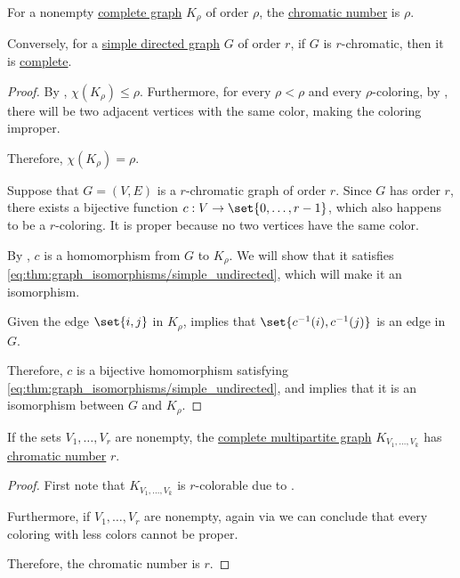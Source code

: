 \begin{proposition}\label{thm:complete_graph_chromatic_number}
  For a nonempty \hyperref[def:complete_graph]{complete graph} \( K_\rho \) of order \( \rho \), the \hyperref[def:graph_chromatic_number]{chromatic number} is \( \rho \).

  Conversely, for a \hyperref[def:directed_graph]{simple directed graph} \( G \) of  order \( r \), if \( G \) is \( r \)-chromatic, then it is \hyperref[def:complete_subgraph]{complete}.
\end{proposition}
\begin{proof}
  \SufficiencySubProof By , \( \chi(K_\rho) \leq \rho \). Furthermore, for every \( \rho < \rho \) and every \( \rho \)-coloring, by , there will be two adjacent vertices with the same color, making the coloring improper.

  Therefore, \( \chi(K_\rho) = \rho \).

  \NecessitySubProof Suppose that \( G = (V, E) \) is a \( r \)-chromatic graph of order \( r \). Since \( G \) has order \( r \), there exists a bijective function \( c: V \to \set{ 0, \ldots, r - 1 } \), which also happens to be a \( r \)-coloring. It is proper because no two vertices have the same color.

  By , \( c \) is a homomorphism from \( G \) to \( K_\rho \). We will show that it satisfies \eqref{eq:thm:graph_isomorphisms/simple_undirected}, which will make it an isomorphism.

  Given the edge \( \set{ i, j } \) in \( K_\rho \),  implies that \( \set{ c^{-1}(i), c^{-1}(j) } \) is an edge in \( G \).

  Therefore, \( c \) is a bijective homomorphism satisfying \eqref{eq:thm:graph_isomorphisms/simple_undirected}, and  implies that it is an isomorphism between \( G \) and \( K_\rho \).
\end{proof}

\begin{proposition}\label{thm:complete_multipartite_graph_chromatic_number}
  If the sets \( V_1, \ldots, V_r \) are nonempty, the \hyperref[def:complete_multipartite_graph]{complete multipartite graph} \( K_{V_1,\ldots,V_k} \) has \hyperref[def:graph_chromatic_number]{chromatic number} \( r \).
\end{proposition}
\begin{proof}
  First note that \( K_{V_1, \ldots, V_k} \) is \( r \)-colorable due to .

  Furthermore, if \( V_1, \ldots, V_r \) are nonempty, again via  we can conclude that every coloring with less colors cannot be proper.

  Therefore, the chromatic number is \( r \).
\end{proof}

